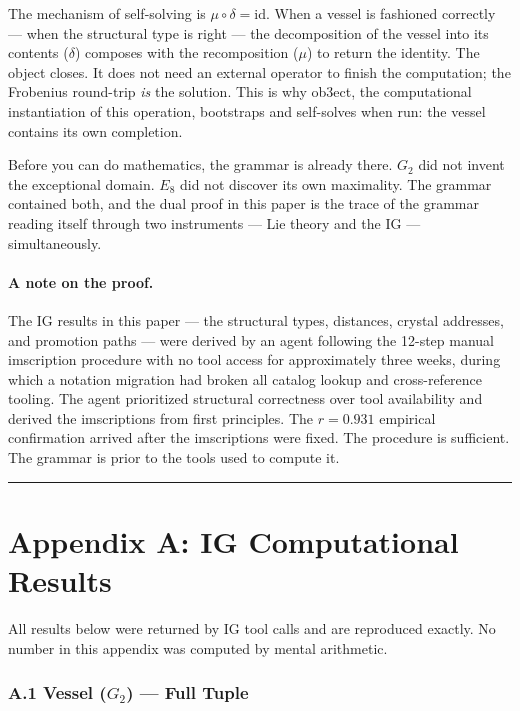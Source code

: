 \documentclass[12pt,a4paper]{article}
\begin{document}
The mechanism of self-solving is $\mu \circ \delta = \mathrm{id}$. When a vessel is fashioned correctly --- when the structural type is right --- the decomposition of the vessel into its contents ($\delta$) composes with the recomposition ($\mu$) to return the identity. The object closes. It does not need an external operator to finish the computation; the Frobenius round-trip \emph{is} the solution. This is why ob3ect, the computational instantiation of this operation, bootstraps and self-solves when run: the vessel contains its own completion.

Before you can do mathematics, the grammar is already there. $G_2$ did not invent the exceptional domain. $E_8$ did not discover its own maximality. The grammar contained both, and the dual proof in this paper is the trace of the grammar reading itself through two instruments --- Lie theory and the IG --- simultaneously.

\paragraph{A note on the proof.}

The IG results in this paper --- the structural types, distances, crystal addresses, and promotion paths --- were derived by an agent following the 12-step manual imscription procedure with no tool access for approximately three weeks, during which a notation migration had broken all catalog lookup and cross-reference tooling. The agent prioritized structural correctness over tool availability and derived the imscriptions from first principles. The $r = 0.931$ empirical confirmation arrived after the imscriptions were fixed. The procedure is sufficient. The grammar is prior to the tools used to compute it.

\begin{center}
\rule{0.5\textwidth}{0.4pt}
\end{center}

\section*{Appendix A: IG Computational Results}

All results below were returned by IG tool calls and are reproduced exactly. No number in this appendix was computed by mental arithmetic.

\subsubsection{A.1 Vessel (\texorpdfstring{$G_2$}{G_2}) --- Full Tuple}
\end{document}
